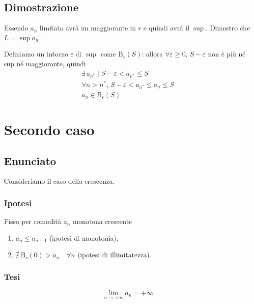 \documentclass[../../dimostrazioni]{subfiles}
\begin{document}
            \subsection*{Dimostrazione}
                Essendo \(a_n\) limitata avrà un maggiorante in \(r\) e quindi avrà il \(\sup\).
                Dimostro che \(L = \sup{a_n}\).

                Definiamo un intorno \(\varepsilon\) di \(\sup\) come \(\mathrm{B}_\varepsilon (S)\): allora
                \(\forall \varepsilon \geqslant 0, \, S-\varepsilon\) non è più né sup né maggiorante, quindi
                \begin{gather*}
                    \exists \, a_{n^*} \mid S-\varepsilon < a_{n^*} \leqslant S \\
                    \forall n > n^*, \, S-\varepsilon < a_{n^*} \leqslant a_n \leqslant S \\
                    a_n \in \mathrm{B}_\varepsilon(S) 
                \end{gather*}
                
        \newpage

        \section*{Secondo caso}

            \subsection*{Enunciato}

            Consideriamo il caso della crescenza.
                
            \subsubsection*{Ipotesi}
                 
            Fisso per comodità \(a_n\) monotona crescente

            \begin{enumerate}
               \indentitem \item \(a_n \leqslant a_{n+1}\) (ipotesi di monotonia);
               \indentitem \item \(\nexists \, \mathrm{B}_r(0) > {a_n} \quad \forall n \) (ipotesi di illimitatezza).
            \end{enumerate}
        
            \subsubsection*{Tesi}
                \[\lim_{n \to +\infty} a_n = +\infty\]
    
\end{document}
